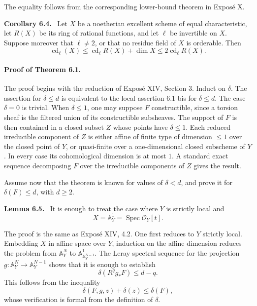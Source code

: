 \documentclass[12pt]{article}
\newcommand{\Oo}{\mathcal O}
\DeclareMathOperator{\Spec}{Spec}
\newenvironment{statement}[1]{\par\medskip\noindent\textbf{#1.}\ }{\par\medskip}
\begin{document}
The equality follows from the corresponding lower-bound theorem in Expos\'e X.

\begin{statement}{Corollary 6.4}
Let $X$ be a noetherian excellent scheme of equal characteristic, let $R(X)$ be its ring of rational functions, and let $\ell$ be invertible on $X$. Suppose moreover that $\ell\ne2$, or that no residue field of $X$ is orderable. Then
\[
   \operatorname{cd}_\ell(X)\leq \operatorname{cd}_\ell R(X)+\dim X
      \leq 2\operatorname{cd}_\ell R(X).
\]
\end{statement}

\paragraph{Proof of Theorem 6.1.}
The proof begins with the reduction of Expos\'e XIV, Section 3. Induct on $\delta$. The assertion for $\delta\le d$ is equivalent to the local assertion 6.1 bis for $\delta\le d$. The case $\delta=0$ is trivial. When $\delta\le1$, one may suppose $F$ constructible, since a torsion sheaf is the filtered union of its constructible subsheaves. The support of $F$ is then contained in a closed subset $Z$ whose points have $\delta\le1$. Each reduced irreducible component of $Z$ is either affine of finite type of dimension $\le1$ over the closed point of $Y$, or quasi-finite over a one-dimensional closed subscheme of $Y$. In every case its cohomological dimension is at most $1$. A standard exact sequence decomposing $F$ over the irreducible components of $Z$ gives the result.

Assume now that the theorem is known for values of $\delta<d$, and prove it for $\delta(F)\le d$, with $d\ge2$.

\begin{statement}{Lemma 6.5}
It is enough to treat the case where $Y$ is strictly local and
\[
   X=\mathbb A^1_Y=\Spec\Oo_Y[t].
\]
\end{statement}

The proof is the same as Expos\'e XIV, 4.2. One first reduces to $Y$ strictly local. Embedding $X$ in affine space over $Y$, induction on the affine dimension reduces the problem from $\mathbb A^N_Y$ to $\mathbb A^1_{\mathbb A^{N-1}_Y}$. The Leray spectral sequence for the projection $g:\mathbb A^N_Y\to\mathbb A^{N-1}_Y$ shows that it is enough to establish
\[
   \delta(R^qg_*F)\le d-q.
\]
This follows from the inequality
\[
   \delta(F,g,z)+\delta(z)\le \delta(F),
\]
whose verification is formal from the definition of $\delta$.
\end{document}
